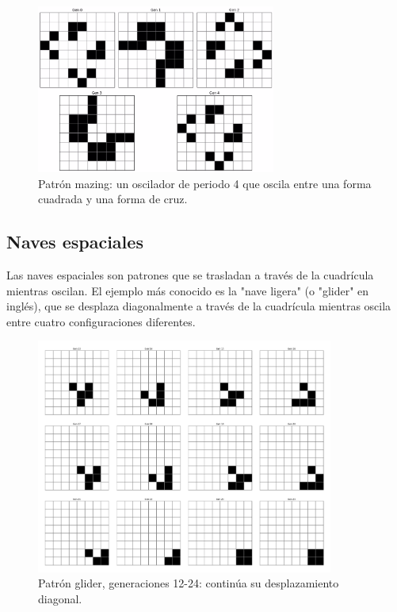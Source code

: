 \documentclass[]{article}
\begin{document}
\begin{figure}[H]
  \centering
  \includegraphics[width=0.7\textwidth]{../assets/oscillator/mazing/mazing.jpg}
  \caption{Patrón mazing: un oscilador de periodo 4 que oscila entre una forma cuadrada y una forma de cruz.}
  \label{fig:mazing}
\end{figure}

\subsection{Naves espaciales}
Las naves espaciales son patrones que se trasladan a través de la cuadrícula mientras oscilan. El ejemplo más conocido es la "nave ligera" (o "glider" en inglés), que se desplaza diagonalmente a través de la cuadrícula mientras oscila entre cuatro configuraciones diferentes.
\begin{figure}[H]
  \centering
  \label{fig:glider}
\end{figure}
\vspace*{-10mm} %
\begin{figure}[H]
  \centering
  \includegraphics[width=0.87\textwidth]{../assets/space_ships/glider/glider_12_24.jpg}
  \caption{Patrón glider, generaciones 12-24: continúa su desplazamiento diagonal.}
  \label{fig:glider_12_24}
\end{figure}
\end{document}

